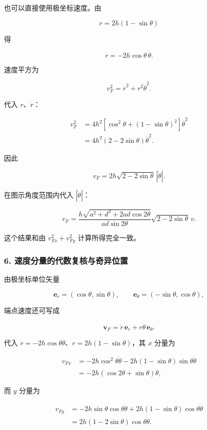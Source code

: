 \documentclass[12pt,a4paper,UTF8]{ctexart}
\begin{document}
也可以直接使用极坐标速度。由

\[
r=2h(1-\sin\theta)
\]

得

\[
\dot r=-2h\cos\theta\,\dot\theta.
\]

速度平方为

\[
v_F^2=\dot r^2+r^2\dot\theta^2.
\]

代入 \(r\)、\(\dot r\)：

\[
\begin{aligned}
v_F^2
&=4h^2\left[\cos^2\theta+(1-\sin\theta)^2\right]\dot\theta^2\\
&=4h^2(2-2\sin\theta)\dot\theta^2.
\end{aligned}
\]

因此

\[
v_F=2h\sqrt{2-2\sin\theta}\,|\dot\theta|.
\]

在图示角度范围内代入 \(|\dot\theta|\)：

\[
\boxed{
v_F=
\frac{h\sqrt{a^2+d^2+2ad\cos2\theta}}
{ad\sin2\theta}
\sqrt{2-2\sin\theta}\,v
}.
\]

这个结果和由 \(v_{Fx}^2+v_{Fy}^2\) 计算所得完全一致。

\subsubsection{6.
速度分量的代数复核与奇异位置}\label{ux901fux5ea6ux5206ux91cfux7684ux4ee3ux6570ux590dux6838ux4e0eux5947ux5f02ux4f4dux7f6e}

由极坐标单位矢量

\[
\bm e_r=(\cos\theta,\sin\theta),
\qquad
\bm e_\theta=(-\sin\theta,\cos\theta),
\]

端点速度还可写成

\[
\bm v_F=\dot r\,\bm e_r+r\dot\theta\,\bm e_\theta.
\]

代入 \(\dot r=-2h\cos\theta\dot\theta\)、\(r=2h(1-\sin\theta)\)，其
\(x\) 分量为

\[
\begin{aligned}
v_{Fx}
&=-2h\cos^2\theta\dot\theta
-2h(1-\sin\theta)\sin\theta\dot\theta\\
&=-2h(\cos2\theta+\sin\theta)\dot\theta,
\end{aligned}
\]

而 \(y\) 分量为

\[
\begin{aligned}
v_{Fy}
&=-2h\sin\theta\cos\theta\dot\theta
+2h(1-\sin\theta)\cos\theta\dot\theta\\
&=2h(1-2\sin\theta)\cos\theta\dot\theta.
\end{aligned}
\]
\end{document}

